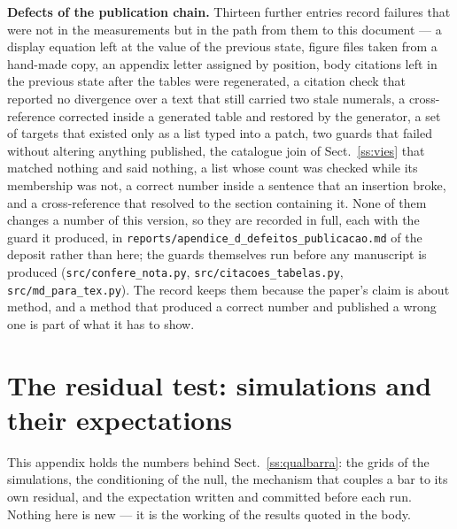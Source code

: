 \documentclass{aa}
\begin{document}
\textbf{Defects of the publication chain.} Thirteen further entries record failures that were not in the measurements but in the path from them to this document --- a display equation left at the value of the previous state, figure files taken from a hand-made copy, an appendix letter assigned by position, body citations left in the previous state after the tables were regenerated, a citation check that reported no divergence over a text that still carried two stale numerals, a cross-reference corrected inside a generated table and restored by the generator, a set of targets that existed only as a list typed into a patch, two guards that failed without altering anything published, the catalogue join of Sect.~\ref{ss:vies} that matched nothing and said nothing, a list whose count was checked while its membership was not, a correct number inside a sentence that an insertion broke, and a cross-reference that resolved to the section containing it. None of them changes a number of this version, so they are recorded in full, each with the guard it produced, in \texttt{reports/apendice\_\allowbreak d\_\allowbreak defeitos\_\allowbreak publicacao.md} of the deposit rather than here; the guards themselves run before any manuscript is produced (\texttt{src/\allowbreak confere\_\allowbreak nota.py}, \texttt{src/\allowbreak citacoes\_\allowbreak tabelas.py}, \texttt{src/\allowbreak md\_\allowbreak para\_\allowbreak tex.py}). The record keeps them because the paper's claim is about method, and a method that produced a correct number and published a wrong one is part of what it has to show.


\section{The residual test: simulations and their expectations}\label{a:D}
This appendix holds the numbers behind Sect.~\ref{ss:qualbarra}: the grids of the simulations, the conditioning of the null, the mechanism that couples a bar to its own residual, and the expectation written and committed before each run. Nothing here is new --- it is the working of the results quoted in the body.
\end{document}

